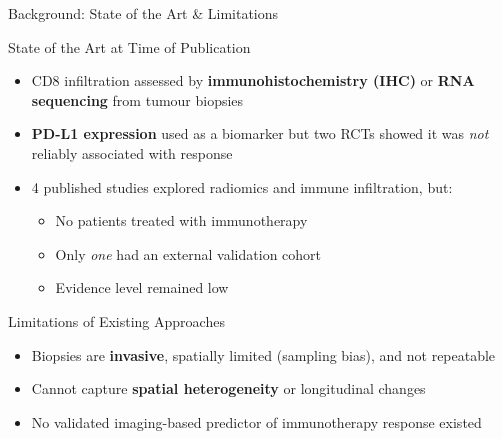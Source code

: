 \documentclass[aspectratio=1610]{beamer}
\begin{document}
\begin{frame}{Background: State of the Art \& Limitations}
    \begin{block}{State of the Art at Time of Publication}
        \begin{itemize}
            \small
            \item CD8 infiltration assessed by \textbf{immunohistochemistry (IHC)} or \textbf{RNA sequencing} from tumour biopsies
            \item \textbf{PD-L1 expression} used as a biomarker but two RCTs showed it was \textit{not} reliably associated with response
            \item 4 published studies explored radiomics and immune infiltration, but:
                \begin{itemize}
                    \item No patients treated with immunotherapy
                    \item Only \textit{one} had an external validation cohort
                    \item Evidence level remained low
                \end{itemize}
        \end{itemize}
    \end{block}
    \begin{alertblock}{Limitations of Existing Approaches}
        \begin{itemize}
            \small
            \item Biopsies are \textbf{invasive}, spatially limited (sampling bias), and not repeatable
            \item Cannot capture \textbf{spatial heterogeneity} or longitudinal changes
            \item No validated imaging-based predictor of immunotherapy response existed
        \end{itemize}
    \end{alertblock}
\end{frame}

\end{document}
